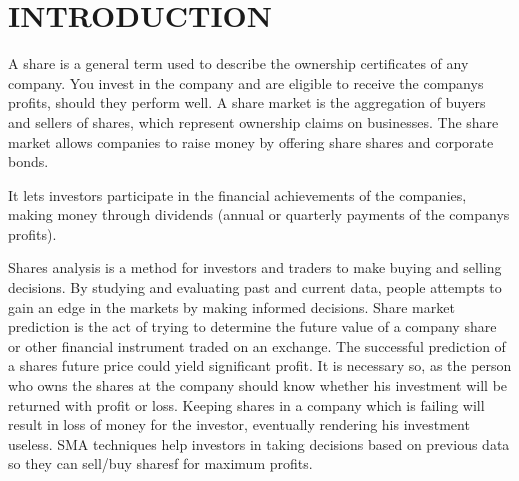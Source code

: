 \documentclass[BTech]{srmuthesis}
\begin{document}

\pagebreak



\chapter{INTRODUCTION}
\label{chap:intro}
A share is a general term used to describe the ownership certificates of any company. You invest in the company and are eligible to receive the company\textquotesingle s profits, should they perform well. A share market is the aggregation of buyers and sellers of shares, which represent ownership claims on businesses. The share market allows companies to raise money by offering share shares and corporate bonds.

It lets investors participate in the financial achievements of the companies, making money through dividends (annual or quarterly payments of the company\textquotesingle s profits).

Shares analysis is a method for investors and traders to make buying and selling decisions. By studying and evaluating past and current data, people attempts to gain an edge in the markets by making informed decisions. Share market prediction is the act of trying to determine the future value of a company share or other financial instrument traded on an exchange. The successful prediction of a share\textquotesingle s future price could yield significant profit. It is necessary so, as the person who owns the shares at the company should know whether his investment will be returned with profit or loss. Keeping shares in a company which is failing will result in loss of money for the investor, eventually rendering his investment useless. SMA techniques help investors in taking decisions based on previous data so they can sell/buy sharesf for maximum profits.
\end{document}
